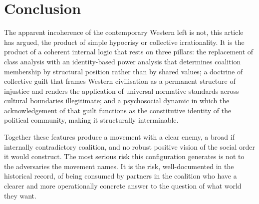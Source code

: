 	\section{Conclusion}
	
	The apparent incoherence of the contemporary Western left is not, this article has
	argued, the product of simple hypocrisy or collective irrationality. It is the
	product of a coherent internal logic that rests on three pillars: the replacement of
	class analysis with an identity-based power analysis that determines coalition
	membership by structural position rather than by shared values; a doctrine of
	collective guilt that frames Western civilisation as a permanent structure of
	injustice and renders the application of universal normative standards across
	cultural boundaries illegitimate; and a psychosocial dynamic in which the
	acknowledgement of that guilt functions as the constitutive identity of the
	political community, making it structurally interminable.
	
	Together these features produce a movement with a clear enemy, a broad if internally
	contradictory coalition, and no robust positive vision of the social order it would
	construct. The most serious risk this configuration generates is not to the
	adversaries the movement names. It is the risk, well-documented in the historical
	record, of being consumed by partners in the coalition who have a clearer and more
	operationally concrete answer to the question of what world they want.

\endgroup
